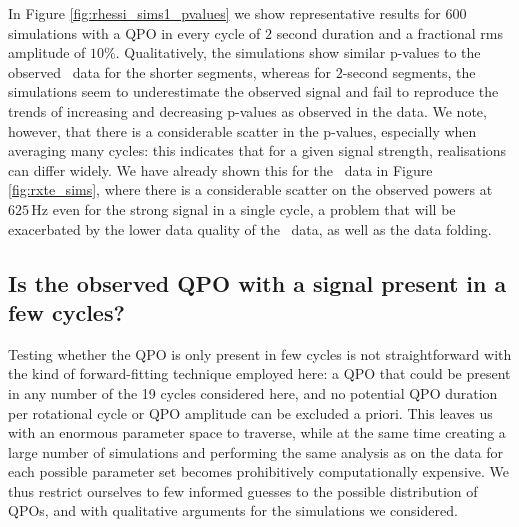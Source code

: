 \documentclass{emulateapj}
\begin{document}
In Figure \ref{fig:rhessi_sims1_pvalues} we show representative results for $600$ simulations with a QPO in every cycle of $2$ second duration and a fractional rms amplitude of $10\%$. Qualitatively, the simulations show similar p-values to the observed \rhessi\ data for the shorter segments, whereas for $2$-second segments, the simulations seem to underestimate the observed signal and fail to reproduce the trends of increasing and decreasing p-values as observed in the data. We note, however, that there is a considerable scatter in the p-values, especially when averaging many cycles: this indicates that for a given signal strength, realisations can differ widely. We have already shown this for the \rxte\ data in Figure \ref{fig:rxte_sims}, where there is a considerable scatter on the observed powers at $625 \, \mathrm{Hz}$ even for the strong signal in a single cycle, a problem that will be exacerbated by the lower data quality of the \rhessi\ data, as well as the data folding.



\subsection{Is the observed QPO with a signal present in a few cycles?}

Testing whether the QPO is only present in few cycles is not straightforward with the kind of forward-fitting technique employed here: a QPO that could be present in any number of the 19 cycles considered here, and no potential QPO duration per rotational cycle or QPO amplitude can be excluded a priori. This leaves us with an enormous parameter space to traverse, while at the same time creating a large number of simulations and performing the same analysis as on the data for each possible parameter set becomes prohibitively computationally expensive. We thus restrict ourselves to few informed guesses to the possible distribution of QPOs, and with qualitative arguments for the simulations we considered. 
\end{document}
